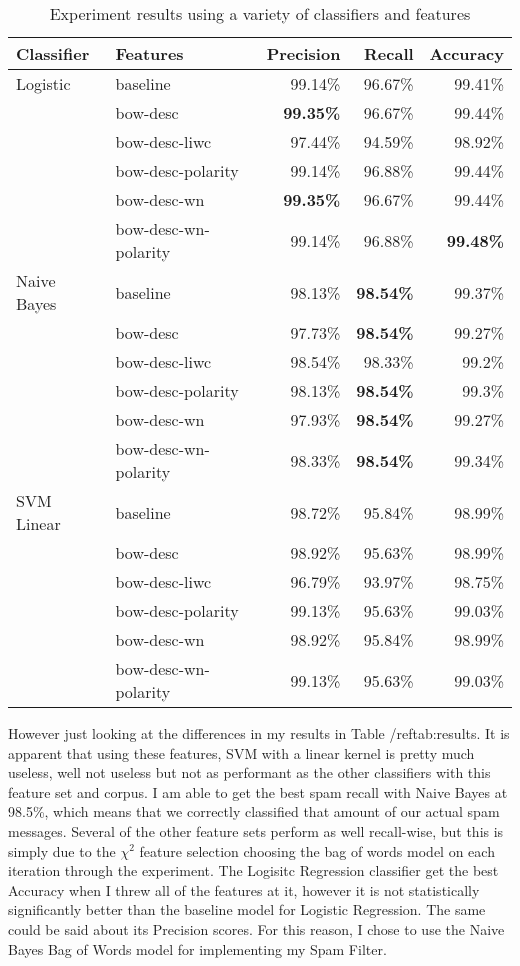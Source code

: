 \documentclass[12pt]{amsart}
\begin{document}
\begin{table}[h]
\centering
\begin{tabular}{| l | l | r | r | r |}
	\hline
	Classifier & Features & Precision & Recall & Accuracy \\
	\hline
	 Logistic & baseline &99.14\% & 96.67\% & 99.41\% \\
	 & bow-desc &{\bf 99.35\%} & 96.67\% & 99.44\% \\
	 & bow-desc-liwc &97.44\% & 94.59\% & 98.92\% \\
	 & bow-desc-polarity &99.14\% & 96.88\% & 99.44\% \\
	 & bow-desc-wn &{\bf 99.35\%} & 96.67\% & 99.44\% \\
	 & bow-desc-wn-polarity &99.14\% & 96.88\% & {\bf 99.48\%} \\
	 \hline
	 Naive Bayes & baseline &98.13\% & {\bf 98.54\%} & 99.37\% \\
	 & bow-desc &97.73\% & {\bf 98.54\%} & 99.27\% \\
	 & bow-desc-liwc &98.54\% & 98.33\% & 99.2\% \\
	 & bow-desc-polarity &98.13\% & {\bf 98.54\%} & 99.3\% \\
	 & bow-desc-wn &97.93\% & {\bf 98.54\%} & 99.27\% \\
	 & bow-desc-wn-polarity &98.33\% & {\bf 98.54\%} & 99.34\% \\
	 \hline
	 SVM Linear& baseline &98.72\% & 95.84\% & 98.99\% \\
	 & bow-desc &98.92\% & 95.63\% & 98.99\% \\
	 & bow-desc-liwc &96.79\% & 93.97\% & 98.75\% \\
	 & bow-desc-polarity &99.13\% & 95.63\% & 99.03\% \\
	 & bow-desc-wn &98.92\% & 95.84\% & 98.99\% \\
	 & bow-desc-wn-polarity &99.13\% & 95.63\% & 99.03\% \\
	\hline
\end{tabular}
\caption{Experiment results using a variety of classifiers and features}
\label{tab:results}
\end{table}


However just looking at the differences in my results in Table /ref{tab:results}.  It is apparent that using these features, SVM with a linear kernel is pretty much useless, well not useless but not as performant as the other classifiers with this feature set and corpus.  I am able to get the best spam recall with Naive Bayes at 98.5\%, which means that we correctly classified that amount of our actual spam messages.  Several of the other feature sets perform as well recall-wise, but this is simply due to the $\chi^2$ feature selection choosing the bag of words model on each iteration through the experiment.  The Logisitc Regression classifier get the best Accuracy when I threw all of the features at it, however it is not statistically significantly better than the baseline model for Logistic Regression.  The same could be said about its Precision scores.  For this reason, I chose to use the Naive Bayes Bag of Words model for implementing my Spam Filter.
\end{document}
